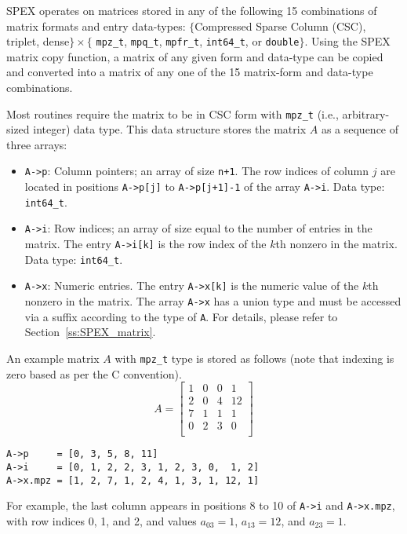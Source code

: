 \documentclass[12pt]{report}
\theoremstyle{definition}
\begin{document}
SPEX operates on matrices stored in any of the following 15 combinations of matrix formats and entry data-types:
$\{$Compressed Sparse Column (CSC), triplet, dense$\} \times \{$ \verb|mpz_t|,
\verb|mpq_t|, \verb|mpfr_t|, \verb|int64_t|, or \verb|double|$\}$. Using the SPEX matrix copy function, a matrix of any given form and data-type can be copied and converted into a matrix of any one of the 15 matrix-form and data-type combinations.

Most routines require the matrix to be in CSC form with \verb|mpz_t| (i.e., arbitrary-sized integer) data
type. This data structure stores the matrix $A$ as a sequence of three arrays:

\begin{itemize}
\item
\verb|A->p|: Column pointers; an array of size \verb|n+1|. The row indices of
column $j$ are located in positions \verb|A->p[j]| to \verb|A->p[j+1]-1| of the
array \verb|A->i|. Data type: \verb|int64_t|.

\item
\verb|A->i|: Row indices; an array of size equal to the number of entries in
the matrix. The entry \verb|A->i[k]| is the row index of the $k$th nonzero in
the matrix. Data type: \verb|int64_t|.

\item
\verb|A->x|: Numeric entries. The entry \verb|A->x[k]| is the numeric value of
the $k$th nonzero in the matrix.  The array \verb|A->x| has a union type and
must be accessed via a suffix according to the type of \verb|A|.  For details,
please refer to Section~\ref{ss:SPEX_matrix}.

\end{itemize}

An example matrix $A$ with \verb|mpz_t| type is stored as follows (note that indexing is zero based as per the C convention).
\[
A = \begin{bmatrix}
1 & 0 & 0 & 1 \\
2 & 0 & 4 & 12 \\
7 & 1 & 1 & 1 \\
0 & 2 & 3 & 0 \\
\end{bmatrix}
\]

\begin{verbatim}
A->p     = [0, 3, 5, 8, 11]
A->i     = [0, 1, 2, 2, 3, 1, 2, 3, 0,  1, 2]
A->x.mpz = [1, 2, 7, 1, 2, 4, 1, 3, 1, 12, 1]
\end{verbatim}

For example, the last column appears in positions 8 to 10 of \verb|A->i| and \verb|A->x.mpz|, with row indices 0, 1, and 2, and values $a_{03}=1$, $a_{13}=12$, and $a_{23}=1$.
\end{document}
